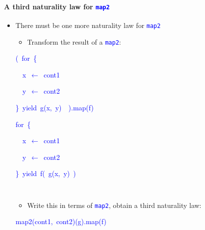 \paragraph{A third naturality law for \texttt{\textcolor{blue}{\footnotesize{}map2}} }
\begin{itemize}
\item \vspace{-0.1cm}There must be one more naturality law for \texttt{\textcolor{blue}{\footnotesize{}map2}} 
\begin{itemize}
\item Transform the result of a \texttt{\textcolor{blue}{\footnotesize{}map2}}:\texttt{\textcolor{blue}{\footnotesize{}\smallskip{}
}}{\footnotesize\par}
\end{itemize}
\texttt{\textcolor{blue}{\footnotesize{}}}%
\begin{minipage}[c][1\totalheight][t]{0.49\columnwidth}%
\begin{lyxcode}
\textcolor{blue}{\footnotesize{}(~for~\{}{\footnotesize\par}

\textcolor{blue}{\footnotesize{}~~x~$\leftarrow$~cont1}{\footnotesize\par}

\textcolor{blue}{\footnotesize{}~~y~$\leftarrow$~cont2}{\footnotesize\par}

\textcolor{blue}{\footnotesize{}\}~yield~g(x,~y)~~).map(f)}{\footnotesize\par}
\end{lyxcode}
%
\end{minipage}\texttt{\textcolor{blue}{\footnotesize{}\hfill{}}}%
\begin{minipage}[c][1\totalheight][t]{0.49\columnwidth}%
\begin{lyxcode}
\textcolor{blue}{\footnotesize{}for~\{}{\footnotesize\par}

\textcolor{blue}{\footnotesize{}~~x~$\leftarrow$~cont1}{\footnotesize\par}

\textcolor{blue}{\footnotesize{}~~y~$\leftarrow$~cont2}{\footnotesize\par}

\textcolor{blue}{\footnotesize{}\}~yield~f(~g(x,~y)~)}{\footnotesize\par}
\end{lyxcode}
%
\end{minipage}\texttt{\textcolor{blue}{\footnotesize{}\hfill{}\medskip{}
}}{\footnotesize\par}
\begin{itemize}
\item Write this in terms of \texttt{\textcolor{blue}{\footnotesize{}map2}},
obtain a third naturality law:
\end{itemize}
\begin{lyxcode}
\textcolor{blue}{\footnotesize{}map2(cont1,~cont2)(g).map(f)}{\footnotesize\par}


\end{lyxcode}
\end{itemize}

